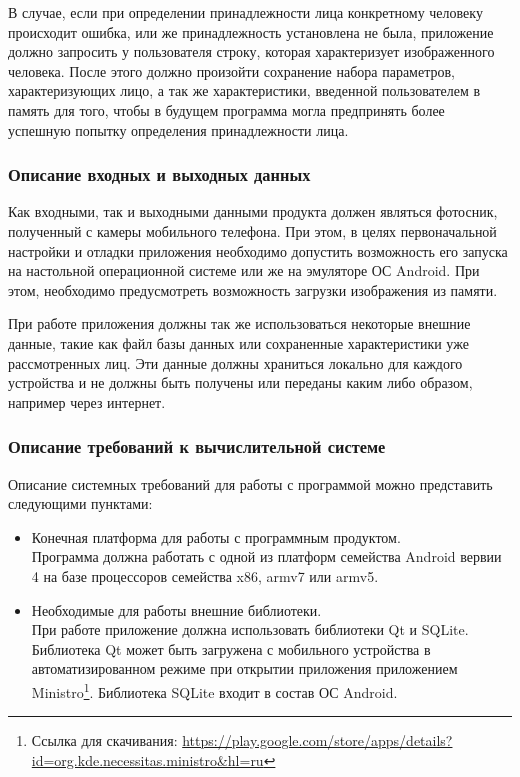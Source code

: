 В случае, если при определении принадлежности лица конкретному человеку 
происходит ошибка, или же принадлежность установлена не была, приложение должно
запросить у пользователя строку, которая характеризует изображенного человека.
После этого должно произойти сохранение набора параметров, характеризующих
лицо, а так же характеристики, введенной пользователем в память для того, чтобы
в будущем программа могла предпринять более успешную попытку определения
принадлежности лица.

\subsubsection{Описание входных и выходных данных}

Как входными, так и выходными данными продукта должен являться фотосник,
полученный с камеры мобильного телефона. При этом, в целях первоначальной
настройки и отладки приложения необходимо допустить возможность его запуска
на настольной операционной системе или же на эмуляторе ОС Android.
При этом, необходимо предусмотреть возможность загрузки изображения из
памяти.

При работе приложения должны так же использоваться некоторые внешние данные,
такие как файл базы данных или сохраненные характеристики уже рассмотренных лиц.
Эти данные должны храниться локально для каждого устройства и не должны быть
получены или переданы каким либо образом, например через интернет.

\subsubsection{Описание требований к вычислительной системе}

Описание системных требований для работы с программой
можно представить следующими пунктами:
\begin{itemize}
    \item Конечная платформа для работы с программным продуктом. \\
        Программа должна работать с одной из платформ семейства Android вервии
        4 на базе процессоров семейства x86, armv7 или armv5.
    \item Необходимые для работы внешние библиотеки. \\
        При работе приложение должна использовать библиотеки Qt и SQLite.
        Библиотека Qt может быть загружена с мобильного устройства в
        автоматизированном режиме при открытии приложения
        приложением Ministro\footnote{%
            Ссылка для скачивания: %
            \url{https://play.google.com/store/apps/details?id=org.kde.necessitas.ministro&hl=ru}}.
            Библиотека SQLite входит в состав ОС Android.
\end{itemize}


\clearpage

